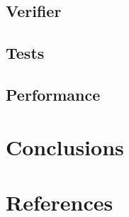 \documentclass[10pt,a4paper]{article}
\begin{document}
\subsection{Verifier}

\subsection{Tests}

\subsection{Performance}

\section{Conclusions}

\section{References}
\end{document}
